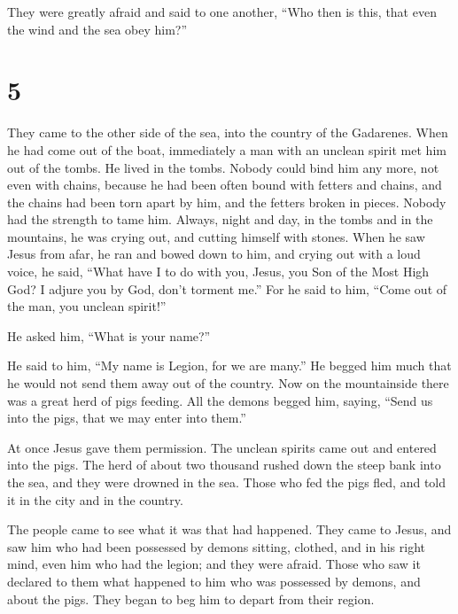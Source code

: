  They were greatly afraid and said to one another, ``Who
then is this, that even the wind and the sea obey him?''

\hypertarget{section-4}{%
\section{5}\label{section-4}}

 They came to the other side of the sea, into the country
of the Gadarenes.  When he had come out of the boat,
immediately a man with an unclean spirit met him out of the tombs.
 He lived in the tombs. Nobody could bind him any more,
not even with chains,  because he had been often bound
with fetters and chains, and the chains had been torn apart by him, and
the fetters broken in pieces. Nobody had the strength to tame him.
 Always, night and day, in the tombs and in the mountains,
he was crying out, and cutting himself with stones.  When
he saw Jesus from afar, he ran and bowed down to him,  and
crying out with a loud voice, he said, ``What have I to do with you,
Jesus, you Son of the Most High God? I adjure you by God, don't torment
me.''  For he said to him, ``Come out of the man, you
unclean spirit!''

 He asked him, ``What is your name?''

He said to him, ``My name is Legion, for we are many.'' 
He begged him much that he would not send them away out of the country.
 Now on the mountainside there was a great herd of pigs
feeding.  All the demons begged him, saying, ``Send us
into the pigs, that we may enter into them.''

 At once Jesus gave them permission. The unclean spirits
came out and entered into the pigs. The herd of about two thousand
rushed down the steep bank into the sea, and they were drowned in the
sea.  Those who fed the pigs fled, and told it in the
city and in the country.

The people came to see what it was that had happened. 
They came to Jesus, and saw him who had been possessed by demons
sitting, clothed, and in his right mind, even him who had the legion;
and they were afraid.  Those who saw it declared to them
what happened to him who was possessed by demons, and about the pigs.
 They began to beg him to depart from their region.

